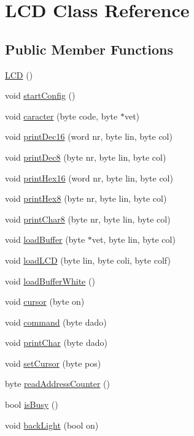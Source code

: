 \hypertarget{class_l_c_d}{}\section{L\+CD Class Reference}
\label{class_l_c_d}
\subsection*{Public Member Functions}
\begin{DoxyCompactItemize}
\item 
\hyperlink{class_l_c_d_a00bb2db1390721abc7b24ac4b8c276c8}{L\+CD} ()
\item 
void \hyperlink{class_l_c_d_abb7937561b3bc75fd672003b81e388f7}{start\+Config} ()
\item 
void \hyperlink{class_l_c_d_a9868c6740864f198778e24b1f38147b9}{caracter} (byte code, byte $\ast$vet)
\item 
void \hyperlink{class_l_c_d_a368ef1f6a659bb7a28b4dabc3ed66c93}{print\+Dec16} (word nr, byte lin, byte col)
\item 
void \hyperlink{class_l_c_d_a9081bd4c9f6e1cfe1aa855a2005eb101}{print\+Dec8} (byte nr, byte lin, byte col)
\item 
void \hyperlink{class_l_c_d_a66ca9248294d9ed3ac3db52c2389da7a}{print\+Hex16} (word nr, byte lin, byte col)
\item 
void \hyperlink{class_l_c_d_a088b602412fafc11266296b8537edc1f}{print\+Hex8} (byte nr, byte lin, byte col)
\item 
void \hyperlink{class_l_c_d_aed5147061cc9761230e2977a5de9fa5d}{print\+Char8} (byte nr, byte lin, byte col)
\item 
void \hyperlink{class_l_c_d_a47a75e256bcc0f76cdd75e5c425e2bf6}{load\+Buffer} (byte $\ast$vet, byte lin, byte col)
\item 
void \hyperlink{class_l_c_d_a3ec14c7f40b08492f65779cbd662e3d1}{load\+L\+CD} (byte lin, byte coli, byte colf)
\item 
void \hyperlink{class_l_c_d_a70a46c817aa34b2a91c153a3dd0e9591}{load\+Buffer\+White} ()
\item 
void \hyperlink{class_l_c_d_ae42ed5491b5e32a2e740d57aebe4e8dd}{cursor} (byte on)
\item 
void \hyperlink{class_l_c_d_a9be7dae5cf36e971cf40472fddb3a2bc}{command} (byte dado)
\item 
void \hyperlink{class_l_c_d_a02c39e2c9424ef4c5ec8a4d83c59b6e6}{print\+Char} (byte dado)
\item 
void \hyperlink{class_l_c_d_a124c2100ce0dded2a83f586fe618eee3}{set\+Cursor} (byte pos)
\item 
byte \hyperlink{class_l_c_d_a9285bcefcb08e96f0aaf7cad56a5b4e0}{read\+Address\+Counter} ()
\item 
bool \hyperlink{class_l_c_d_a9a83a13b931a2ccbb17c80a119869d24}{is\+Busy} ()
\item 
void \hyperlink{class_l_c_d_a3342a83c4cc8afa0da7c0ea8ef10d549}{back\+Light} (bool on)
\end{DoxyCompactItemize}
